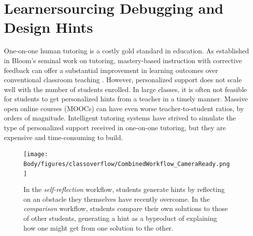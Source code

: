 \chapter{Learnersourcing Debugging and Design Hints}\label{chapter:classoverflow}



One-on-one human tutoring is a costly gold standard in education. As established in Bloom's seminal work on tutoring, mastery-based instruction with corrective feedback can offer a substantial improvement in learning outcomes over conventional classroom teaching \cite{bloom19842}. However, personalized support does not scale well with the number of students enrolled. In large classes, it is often not feasible for students to get personalized hints from a teacher in a timely manner. Massive open online courses (MOOCs) can have even worse teacher-to-student ratios, by orders of magnitude. Intelligent tutoring systems have strived to simulate the type of personalized support received in one-on-one tutoring, but they are expensive and time-consuming to build. 

\begin{figure}
\centering
\texttt{[image: Body/figures/classoverflow/CombinedWorkflow\_CameraReady.png]}
\caption{In the \textit{self-reflection} workflow, students generate hints by reflecting on an obstacle they themselves have recently overcome. In the \textit{comparison} workflow, students compare their own solutions to those of other students, generating a hint as a byproduct of explaining how one might get from one solution to the other.}
\label{fig:workflow}
\end{figure}

